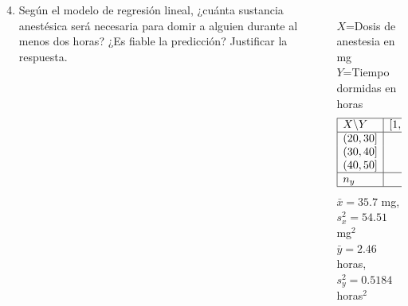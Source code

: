 \documentclass[aspectratio=149,10pt,xcolor=dvipsnames,t]{beamer}
\begin{document}
\begin{frame}
\begin{columns}
\begin{column}[T]{0.55\textwidth}
\begin{enumerate}
\setcounter{enumi}{3}
\item Según el modelo de regresión lineal, ¿cuánta sustancia anestésica será necesaria para domir a alguien durante al menos dos horas?
¿Es fiable la predicción? 
Justificar la respuesta.
\end{enumerate}
\end{column}
\begin{column}[T]{0.45\textwidth}
\\
$X$=Dosis de anestesia en mg\\
$Y$=Tiempo dormidas en horas
\[
\begin{array}{|l|rrr|r|}
\hline 
X\backslash Y & [1,2) & [2,3) & [3,4) & n_x\\
\hline
(20,30] & 14 & 10 & 0 & 24\\
(30,40] & 12 & 26 & 7 & 45\\
(40,50] & 2 & 12 & 17 & 31\\
\hline
n_y & 28 & 48 & 24 & 100\\
\hline
\end{array}
\]
$\bar x =35.7$ mg, $s^2_x=54.51$ mg$^2$\\
$\bar y =2.46$ horas, $s^2_y=0.5184$ horas$^2$
\end{column}
\end{columns}
\end{frame}
\end{document}
